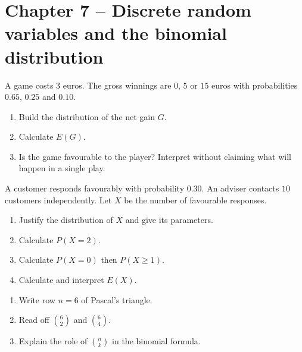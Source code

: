 \section*{Chapter 7 -- Discrete random variables and the binomial distribution}
\begin{exercice}
A game costs $3$ euros. The gross winnings are $0$, $5$ or $15$ euros with probabilities $0.65$, $0.25$ and $0.10$.
\begin{enumerate}
\item Build the distribution of the net gain $G$.
\item Calculate $E(G)$.
\item Is the game favourable to the player? Interpret without claiming what will happen in a single play.
\end{enumerate}
\end{exercice}
\begin{exercice}
A customer responds favourably with probability $0.30$. An adviser contacts $10$ customers independently. Let $X$ be the number of favourable responses.
\begin{enumerate}
\item Justify the distribution of $X$ and give its parameters.
\item Calculate $P(X=2)$.
\item Calculate $P(X=0)$ then $P(X\geq1)$.
\item Calculate and interpret $E(X)$.
\end{enumerate}
\end{exercice}
\begin{exercice}
\begin{enumerate}
\item Write row $n=6$ of Pascal's triangle.
\item Read off $\binom62$ and $\binom64$.
\item Explain the role of $\binom nk$ in the binomial formula.
\end{enumerate}
\end{exercice}

